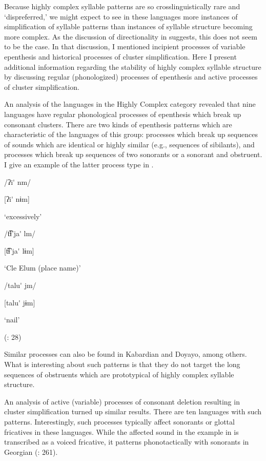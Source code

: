   Because highly complex syllable patterns are so crosslinguistically rare and ‘dispreferred,’ we might expect to see in these languages more instances of simplification of syllable patterns than instances of syllable structure becoming more complex. As the discussion of directionality in  suggests, this does not seem to be the case. In that discussion, I mentioned incipient processes of variable epenthesis and historical processes of cluster simplification. Here I present additional information regarding the stability of highly complex syllable structure by discussing regular (phonologized) processes of epenthesis and active processes of cluster simplification.

  An analysis of the languages in the Highly Complex category revealed that nine languages have regular phonological processes of epenthesis which break up consonant clusters. There are two kinds of epenthesis patterns which are characteristic of the languages of this group: processes which break up sequences of sounds which are identical or highly similar (e.g., sequences of sibilants), and processes which break up sequences of two sonorants or a sonorant and obstruent. I give an example of the latter process type in .

\ea\label{ex:8.7}

\ea  /ʔi\'{} nm/

  [ʔi\'{} nɨm]

  ‘excessively’

\ex  /t͡ɬ’ja\'{} lm/

  [t͡ɬ’ja\'{} lɨm]

  ‘Cle Elum (place name)’

\ex  /talu\'{} jm/

  [talu\'{} jɨm]

  ‘nail’

(\citealt{HargusBeavert2006}: 28)
\z
\z

Similar processes can also be found in Kabardian and Doyayo, among others. What is interesting about such patterns is that they do not target the long sequences of obstruents which are prototypical of highly complex syllable structure.

  An analysis of active (variable) processes of consonant deletion resulting in cluster simplification turned up similar results. There are ten languages with such patterns. Interestingly, such processes typically affect sonorants or glottal fricatives in these languages. While the affected sound in the example in  is transcribed as a voiced fricative, it patterns phonotactically with sonorants in Georgian (\citealt{ShostedChikovani2006}: 261).

